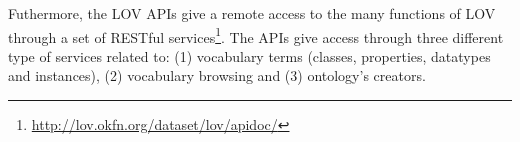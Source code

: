 Futhermore, the LOV APIs give a remote access to the many functions of LOV through a set of RESTful services\footnote{\url{http://lov.okfn.org/dataset/lov/apidoc/}}. %
The APIs give access through three different type of services related to: (1) vocabulary terms (classes, properties, datatypes and instances), (2) vocabulary browsing and (3) ontology's creators. 



